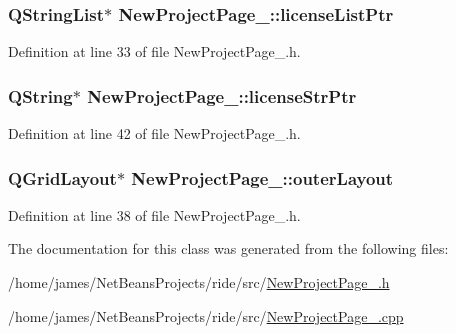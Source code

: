 \hypertarget{class_new_project_page__3_a5bcc5f30aa601338c5ee258e21868216}{
\subsubsection[{license\-List\-Ptr}]{\setlength{\rightskip}{0pt plus 5cm}Q\-String\-List$\ast$ New\-Project\-Page\-\_\-::license\-List\-Ptr\hspace{0.3cm}{\ttfamily [private]}}}\label{class_new_project_page__3_a5bcc5f30aa601338c5ee258e21868216}


Definition at line 33 of file New\-Project\-Page\-\_.\-h.

\hypertarget{class_new_project_page__3_aa571b8638ba533ee7e6bee7c476d259e}{
\subsubsection[{license\-Str\-Ptr}]{\setlength{\rightskip}{0pt plus 5cm}Q\-String$\ast$ New\-Project\-Page\-\_\-::license\-Str\-Ptr\hspace{0.3cm}{\ttfamily [private]}}}\label{class_new_project_page__3_aa571b8638ba533ee7e6bee7c476d259e}


Definition at line 42 of file New\-Project\-Page\-\_.\-h.

\hypertarget{class_new_project_page__3_ade0fb5d0c05524c44f8b411150533757}{
\subsubsection[{outer\-Layout}]{\setlength{\rightskip}{0pt plus 5cm}Q\-Grid\-Layout$\ast$ New\-Project\-Page\-\_\-::outer\-Layout\hspace{0.3cm}{\ttfamily [private]}}}\label{class_new_project_page__3_ade0fb5d0c05524c44f8b411150533757}


Definition at line 38 of file New\-Project\-Page\-\_.\-h.



The documentation for this class was generated from the following files\-:\begin{DoxyCompactItemize}
\item 
/home/james/\-Net\-Beans\-Projects/ride/src/\hyperlink{_new_project_page__3_8h}{New\-Project\-Page\-\_.\-h}\item 
/home/james/\-Net\-Beans\-Projects/ride/src/\hyperlink{_new_project_page__3_8cpp}{New\-Project\-Page\-\_.\-cpp}\end{DoxyCompactItemize}
